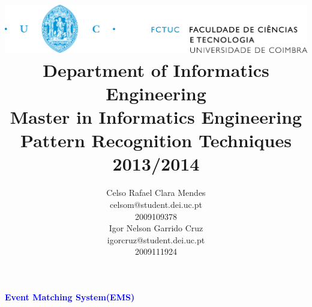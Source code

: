 \documentclass[english, a4paper, 12pt]{article}
\title{ \includegraphics[scale=0.5]{fctuc.jpg}\\
		\bigskip\bigskip\bigskip\bigskip
		\horrule{3.5pt}		
		\LARGE Department of Informatics Engineering\\\medskip
		\Large Master in Informatics Engineering\\\medskip
		\Large Pattern Recognition Techniques\\\medskip
		\large 2013/2014\\\bigskip\horrule{2.5pt}\bigskip\bigskip
		}
\date{}
\begin{document}
\begin{titlepage}

\clearpage
\maketitle
\thispagestyle{empty}


\begin{center}
		\Huge \textcolor{blue}{{\bf Event Matching System(EMS)}} \\
\end{center}
\vfill
\begin{center}
		\author{	
			\large Celso Rafael Clara Mendes\\
			\large celsom@student.dei.uc.pt\\
			\large 2009109378\bigskip\medskip\\
			\large Igor Nelson Garrido Cruz\\
			\large igorcruz@student.dei.uc.pt\\
			\large 2009111924
		}
\end{center}
\end{titlepage}


\newpage
\thispagestyle{empty}
\tableofcontents



\newpage
\setcounter{page}{1}
\end{document}
